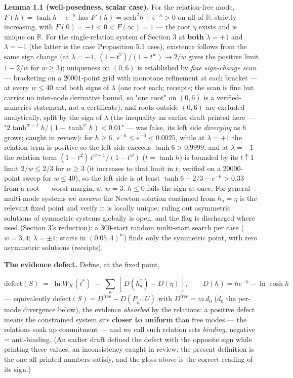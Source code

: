 \documentclass[11pt]{article}
\begin{document}
\textbf{Lemma 1.1 (well-posedness, scalar case).}  For the relation-free mode, $F(h) = \tanh h - e^{-h}$ has $F'(h) = \mathrm{sech}^2 h + e^{-h} > 0$ on all of $\mathbb R$: strictly increasing, with $F(0) = -1 < 0 < F(\infty) = 1$ — the root $\eta$ exists and is unique on $\mathbb R$.  For the single-relation system of Section 3 at \textbf{both} $\lambda = +1$ and $\lambda = -1$ (the latter is the case Proposition 5.1 uses), existence follows from the same sign change (at $\lambda = -1$, $(1-t^2)/(1-t^w) \to 2/w$ gives the positive limit $1 - 2/w$ for $w \ge 3$); uniqueness on $(0, 6)$ is established by \emph{fine sign-change scan} — bracketing on a $20001$-point grid with monotone refinement at each bracket — at every $w \le 40$ and both signs of $\lambda$ (one root each; receipts; the scan is fine but carries no inter-node derivative bound, so "one root" on $(0,6)$ is a verified-numerics statement, not a certificate), and roots outside $(0,6)$ are excluded analytically, split by the sign of $\lambda$ (the inequality an earlier draft printed here — "$2\tanh^{w-1}h/(1-\tanh^w h) < 0.01$" — was false, its left side \emph{diverging} as $h$ grows; caught in review): for $h \ge 6$, $e^{-h} \le e^{-6} < 0.0025$, while at $\lambda = +1$ the relation term is positive so the left side exceeds $\tanh 6 > 0.9999$, and at $\lambda = -1$ the relation term $(1-t^2)\,t^{w-1}/(1-t^w)$ ($t = \tanh h$) is bounded by its $t \uparrow 1$ limit $2/w \le 2/3$ for $w \ge 3$ (it increases to that limit in $t$; verified on a $20000$-point sweep for $w \le 40$), so the left side is at least $\tanh 6 - 2/3 - e^{-6} > 0.33$ from a root — worst margin, at $w = 3$.  $h \le 0$ fails the sign at once.  For general multi-mode systems we \emph{assume} the Newton solution continued from $h_a = \eta$ is the relevant fixed point and verify it is locally unique; ruling out asymmetric solutions of symmetric systems globally is open, and the flag is discharged where used (Section 3's reduction): a $300$-start random multi-start search per case ($w = 3, 4$; $\lambda = \pm 1$; starts in $(0.05, 4)^w$) finds only the symmetric point, with zero asymmetric solutions (receipts).

\textbf{The evidence defect.}  Define, at the fixed point,

\[
\mathrm{defect}(S) \;=\; \ln W_K(t^*)
\;-\; \sum_{a}\,[\,D(h_a^*) - D(\eta)\,],
\qquad D(h) = he^{-h} - \ln\cosh h
\]
— equivalently $\mathrm{defect}(S) = D^{\mathrm{free}} - D(P_{h^*}\Vert U)$ with $D^{\mathrm{free}} = m\,d_0$ ($d_0$ the per-mode divergence below), the evidence \emph{absorbed} by the relations: a positive defect means the constrained system sits \textbf{closer to uniform} than free modes — the relations soak up commitment — and we call such relation sets \emph{binding}; negative = anti-binding. (An earlier draft defined the defect with the opposite sign while printing these values, an inconsistency caught in review; the present definition is the one all printed numbers satisfy, and the gloss above is the correct reading of its sign.)
\end{document}
